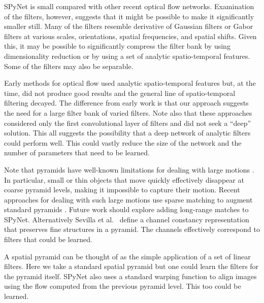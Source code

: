 \documentclass[10pt,twocolumn,letterpaper]{article}
\begin{document}

SPyNet is small compared with other recent optical flow networks.
Examination of the filters, however, suggests that it might be possible to make it significantly smaller still.
Many of the filters resemble derivative of Gaussian filters or Gabor filters at various scales, orientations, spatial frequencies, and spatial shifts.
Given this, it may be possible to significantly compress the filter bank by using dimensionality reduction or by using a set of analytic spatio-temporal features.
Some of the filters may also be separable.

Early methods for optical flow used analytic spatio-temporal features but, at the time, did not produce good results and the general line of spatio-temporal filtering decayed.
The difference from early work is that our approach suggests the need for a large filter bank of varied filters.
Note also that these approaches considered only the first convolutional layer of filters and did not seek a ``deep'' solution. 
This all suggests the possibility that a deep network of analytic filters could perform well.  
This could vastly reduce the size of the network and the number of parameters that need to be learned.

Note that pyramids have well-known limitations for dealing with large motions \cite{brox2009large,Sevilla:ECCV:2014}.
In particular, small or thin objects that move quickly effectively disappear at coarse pyramid levels, making it impossible to capture their motion.
Recent approaches for dealing with such large motions use sparse matching to augment standard pyramids \cite{brox2009large,weinzaepfel2013deepflow}.
Future work should explore adding long-range matches to SPyNet.
Alternatively Sevilla et al.~\cite{Sevilla:ECCV:2014} define a channel constancy representation that preserves fine structures in a pyramid.
The channels effectively correspond to filters that could be learned.

A spatial pyramid can be thought of as the simple application of a set of linear filters.
Here we take a standard spatial pyramid but one could learn the filters for the pyramid itself.
SPyNet also uses a standard warping function to align images using the flow computed from the previous pyramid level. 
This too could be learned. 
\end{document}
